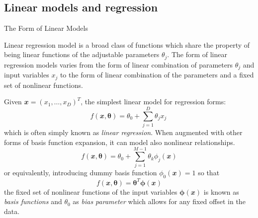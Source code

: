 \documentclass{bredelebeamer}
\begin{document}
\subsection{Linear models and regression}
\begin{frame}{The Form of Linear Models}
  \begin{justify}
    Linear regression model is a broad class of functions which share the
    property of being linear functions of the adjustable parameters $\theta_j$.
    The form of linear regression models varies from the form of linear combination
    of parameters $\theta_j$ and input variables $x_j$ to the form of linear
    combination of the parameters and a fixed set of nonlinear functions.

    \vspace{1.0\baselineskip}
    Given $\mathbfit{x}={(x_{1}, \ldots, x_{D})}^{\mathit{T}}$, the simplest linear
    model for regression forms:
    \begin{equation}
      f(\mathbfit{x}, \boldsymbol{\theta}) = \theta_0 + \sum_{j=1}^{D} \theta_{j} x_{j} \
    \end{equation}
    which is often simply known as \textit{linear regression}.
    When augmented with other forms of basis function expansion, it can model
    also nonlinear relationships.
    \begin{equation}
      f(\mathbfit{x}, \boldsymbol{\theta}) = \theta_0 + \sum_{j=1}^{M-1} \theta_{k} {\phi_{j} (\mathbfit{x})}
    \end{equation}
    or equivalently, introducing dummy basis function $\phi_{0}(\mathbfit{x}) = 1$ so that
    \begin{equation}
      f(\mathbfit{x}, \boldsymbol{\theta}) = \boldsymbol{\theta}^{\mathit{T}} {\boldsymbol{\phi}(\mathbfit{x})}
    \end{equation}
    the fixed set of nonlinear functions of the input variables $\boldsymbol{\phi}(\mathbfit{x})$
    is known as \textit{basis functions} and $\theta_0$ as \textit{bias parameter}
    which allows for any fixed offset in the data.
  \end{justify}
\end{frame}
\end{document}
